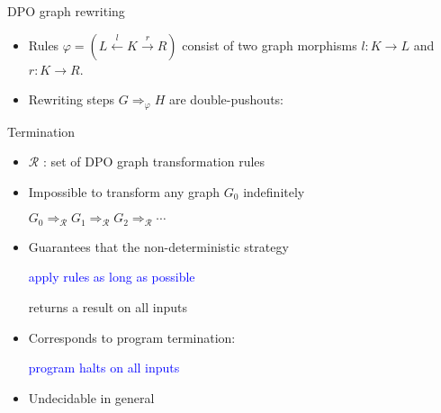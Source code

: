 \documentclass{beamer}
\begin{document}
\begin{frame}{DPO graph rewriting}
\begin{adjustwidth}{-0.5cm}{0cm}
\begin{itemize}
      \item Rules $\varphi = (L \overset{l}{\leftarrow} K \overset{r}{\rightarrow} R)$ consist of two graph morphisms $l: K \to L$ and $r: K \to R$.
      \item Rewriting steps $G \Rightarrow_\varphi H$ are double-pushouts:
         \begin{center}
      \end{center}
  \end{itemize} 
\end{adjustwidth}
\end{frame} 

\begin{frame}{Termination}
  \begin{itemize}
    \item $\mathcal{R}$ : set of DPO graph transformation rules
    \item Impossible to transform any graph $G_0$ indefinitely
      \begin{center}
        $G_0 \Rightarrow_\mathcal{R} G_1 \Rightarrow_\mathcal{R} G_2 \Rightarrow_\mathcal{R} \cdots$
      \end{center}
    \item Guarantees that the non-deterministic strategy
          \begin{center}
              \textcolor{blue}{apply rules as long as possible}
          \end{center}
          returns a result on all inputs
    \item Corresponds to program termination:
          \begin{center}
            \textcolor{blue}{program halts on all inputs}
          \end{center}
    \item Undecidable in general
  \end{itemize}
\end{frame}
\end{document}
